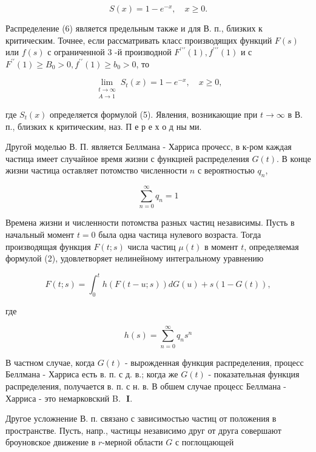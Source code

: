 \documentclass[10pt]{article}
\begin{document}
\[

S(x)=1-e^{-x}, \quad x \geqslant 0 .

\]



Распределение (6) является предельным также и для В. п., близких к критическим. Точнее, если рассматривать класс производящих функций $F(s)$ или $f(s)$ с ограниченной 3 -й производной $F^{\prime \prime \prime}(1), f^{\prime \prime \prime}(1)$ и с $F^{\prime \prime}(1) \geqslant B_{0}>0, f^{\prime \prime}(1) \geqslant b_{0}>0$, то



\[

\lim _{\substack{t \rightarrow \infty \\ A \rightarrow 1}} S_{t}(x)=1-e^{-x}, \quad x \geqslant 0,

\]



где $S_{t}(x)$ определяется формулой (5). Явления, возникающие при $t \rightarrow \infty$ в В. п., близких к критическим, наз. П е р е х о д ны ми.



Другой моделью В. П. является Беллмана - Харриса прочесс, в к-ром каждая частица имеет случайное время жизни с функцией распределения $G(t)$. В конце жизни частица оставляет потомство численности $n$ с вероятностью $q_{n}$,



\[

\sum_{n=0}^{\infty} q_{n}=1

\]



Времена жизни и численности потомства разных частиц независимы. Пусть в начальный момент $t=0$ была одна частица нулевого возраста. Тогда производящая функция $F(t ; s)$ числа частиц $\mu(t)$ в момент $t$, определяемая формулой (2), удовлетворяет нелинейному интегральному уравнению



\[

F(t ; s)=\int_{0}^{t} h(F(t-u ; s)) d G(u)+s(1-G(t)),

\]



где



\[

h(s)=\sum_{n=0}^{\infty} q_{n} s^{n}

\]



В частном случае, когда $G(t)$ - вырожденная функция распределения, процесс Беллмана - Харриса есть в. п. с д. в.; когда же $G(t)$ - показательная функция распределения, получается в. п. с н. в. В обшем случае процесс Беллмана - Харриса - это немарковский B. $\boldsymbol{\text { I. }}$



Другое усложнение В. п. связано с зависимостью частиц от положения в пространстве. Пусть, напр., частицы независимо друг от друга совершают броуновское движение в $r$-мерной области $G$ с поглощающей
\end{document}
